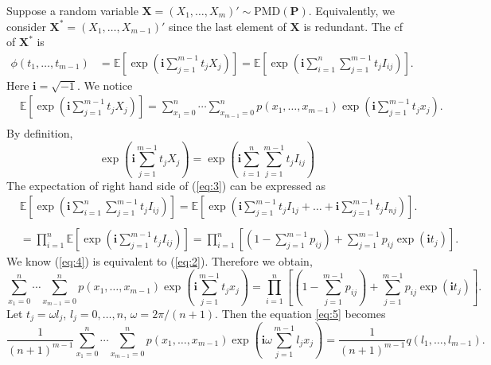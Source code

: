 \documentclass[12pt]{article}
\newcommand{\EE}{\mathbb{E}}
\newcommand{\Pmat}{\mathbf{P}}
\newcommand{\ivec}{{\boldsymbol{i}}}
\newcommand{\PMD}{\textrm{PMD}}
\newcommand{\Xvec}{\boldsymbol{X}}
\begin{document}
Suppose a random variable $\Xvec =  (X_1, \dots, X_{m})' \sim \PMD(\Pmat)$. Equivalently, we consider $\Xvec^{\ast} = (X_1, \dots, X_{m-1})'$ since the last element of $\Xvec$ is redundant. The cf of $\Xvec^{\ast}$ is
\begin{align}
\phi(t_1, \dots, t_{m-1}) & = \EE\left[\exp\left(\ivec\sum_{j=1}^{m-1}t_jX_j\right)\right]=\EE\left[\exp\left(\ivec\sum_{i = 1}^n \sum_{j=1}^{m-1}t_j I_{ij}\right)\right].
\end{align}
Here $\ivec=\sqrt{-1}$. We notice
\begin{equation}\label{eq:2}
\begin{split}
  &\EE\left[\exp\left(\ivec\sum_{j=1}^{m-1}t_jX_j\right)\right] = \sum_{x_1 = 0}^{n}\cdots \sum_{x_{m-1} = 0}^n p(x_1,\ldots,x_{m-1})\exp\left(\ivec\sum_{j=1}^{m-1}t_jx_j\right).\\
\end{split}
\end{equation}
By definition,
\begin{equation}\label{eq:3}
\exp\left(\ivec\sum_{j=1}^{m-1}t_jX_j\right)= \exp\left(\ivec\sum_{i = 1}^n \sum_{j=1}^{m-1}t_j I_{ij}\right)
\end{equation}
The expectation of right hand side of (\ref{eq:3}) can be expressed as
\begin{equation}\label{eq:4}
\begin{split}
  &\EE\left[\exp\left(\ivec\sum_{i = 1}^n \sum_{j=1}^{m-1}t_j I_{ij}\right)\right] = \EE\left[ \exp\left( \ivec\sum_{j=1}^{m-1} t_jI_{1j} + \dots + \ivec\sum_{j=1}^{m-1} t_jI_{nj}\right)\right].\\
  \\
  & = \prod_{i=1}^n \EE\left[ \exp\left( \ivec \sum_{j=1}^{m-1} t_j I_{ij}\right)\right] = \prod_{i=1}^n \left[(1 - \sum_{j=1}^{m-1}p_{ij})+\sum_{j=1}^{m-1}p_{ij}\exp(\ivec t_j)\right].
\end{split}
\end{equation}
We know (\ref{eq:4}) is equivalent to (\ref{eq:2}). Therefore we obtain,
\begin{equation}\label{eq:5}
\sum_{x_1 = 0}^{n}\cdots \sum_{x_{m-1} = 0}^n p(x_1,\ldots,x_{m-1})\exp\left(\ivec\sum_{j=1}^{m-1}t_jx_j\right)= \prod_{i=1}^{n}\left[(1 - \sum_{j=1}^{m-1}p_{ij})+\sum_{j=1}^{m-1}p_{ij}\exp(\ivec t_j)\right].
\end{equation}
Let $t_j = \omega l_j$, $l_j = 0, \ldots, n$, $\omega = 2\pi/(n+1)$. Then the equation \ref{eq:5} becomes
\begin{equation}\label{eq:6}
\frac{1}{(n+1)^{m-1}} \sum_{x_1 = 0}^{n}\cdots \sum_{x_{m-1} = 0}^n p(x_1,\ldots,x_{m-1}) \exp\left(\ivec\omega\sum_{j=1}^{m-1}l_j x_j\right)= \frac{1}{(n+1)^{m-1}} q(l_1, \ldots, l_{m-1}).
\end{equation}
\end{document}
